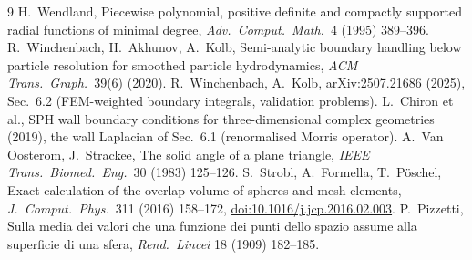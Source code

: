 \documentclass[11pt,a4paper]{article}
\theoremstyle{definition}
\theoremstyle{remark}
\begin{document}
\begin{thebibliography}{9}
 H.~Wendland, Piecewise polynomial, positive definite and compactly supported
radial functions of minimal degree, \emph{Adv.\ Comput.\ Math.}\ 4 (1995) 389--396.
 R.~Winchenbach, H.~Akhunov, A.~Kolb, Semi-analytic boundary handling below
particle resolution for smoothed particle hydrodynamics, \emph{ACM Trans.\ Graph.}\ 39(6) (2020).
 R.~Winchenbach, A.~Kolb, arXiv:2507.21686 (2025), Sec.~6.2 (FEM-weighted
boundary integrals, validation problems).
 L.~Chiron et al., SPH wall boundary conditions for three-dimensional complex
geometries (2019), the wall Laplacian of Sec.~6.1 (renormalised Morris operator).
 A.~Van Oosterom, J.~Strackee, The solid angle of a plane triangle,
\emph{IEEE Trans.\ Biomed.\ Eng.}\ 30 (1983) 125--126.
 S.~Strobl, A.~Formella, T.~P\"oschel,
Exact calculation of the overlap volume of spheres and mesh elements,
\emph{J.\ Comput.\ Phys.}\ 311 (2016) 158--172,
\href{https://doi.org/10.1016/j.jcp.2016.02.003}{doi:10.1016/j.jcp.2016.02.003}.
 P.~Pizzetti, Sulla media dei valori che una funzione dei punti dello spazio
assume alla superficie di una sfera, \emph{Rend.\ Lincei} 18 (1909) 182--185.
\end{thebibliography}
\end{document}

